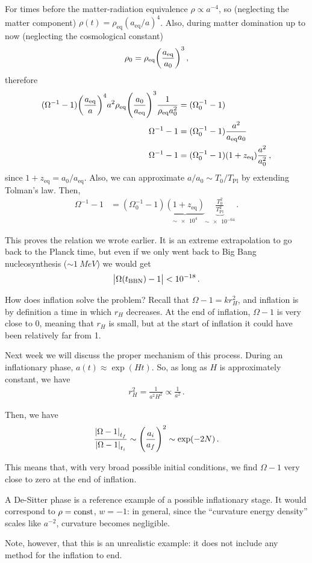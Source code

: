 \documentclass[main.tex]{subfiles}
\begin{document}
For times before the matter-radiation equivalence \(\rho \propto a^{-4}\), so (neglecting the matter component) \(\rho (t) = \rho _{\text{eq}} (a _{\text{eq}} / a)^{4}\). Also, during matter domination up to now (neglecting the cosmological constant)
%
\begin{align}
\rho_0 = \rho _{\text{eq}} \qty(\frac{a _{\text{eq}}}{a_0 })^3
\,,
\end{align}
%
therefore 
%
\begin{align}
(\Omega^{-1} -1) \qty(\frac{a _{\text{eq}}}{a})^{4} a^2 \rho _{\text{eq}} \qty(\frac{a_0 }{a _{\text{eq}}})^{3} \frac{1}{\rho _{\text{eq}} a_0^2} &= (\Omega_0^{-1} - 1)
\\
\Omega^{-1} - 1 &= (\Omega_0^{-1} -1) \frac{a^2}{a _{\text{eq}} a_0 } \\
\Omega^{-1} - 1 &= (\Omega_0^{-1} -1) (1 + z _{\text{eq}}) \frac{a^2}{a_0^2}
\,,
\end{align}
%
since \(1 + z _{\text{eq}} = a_0 / a _{\text{eq}}\). Also, we can approximate \(a/a_0 \sim T_0 / T _{\text{Pl}}\) by extending Tolman's law. 
Then, 
%
\begin{align}
\Omega^{-1} - 1 &= (\Omega_0^{-1} -1) \underbrace{(1 + z _{\text{eq}})}_{\sim \num{e4}} \underbrace{\frac{T_0 ^2}{T _{\text{Pl}}^2}}_{\sim \num{e-64}}
\,.
\end{align}

This proves the relation we wrote earlier. It is an extreme extrapolation to go back to the Planck time, but even if we only went back to Big Bang nucleosynthesis (\(\sim \SI{1}{MeV}\)) we would get 
%
\begin{align}
\abs{\Omega (t _{\text{BBN}}) - 1 } < \num{e-18}
\,.
\end{align}

How does inflation solve the problem?
Recall that \(\Omega -1  = k r_H^2\), and inflation is by definition a time in which \(r_H\) decreases. 
At the end of inflation, \(\Omega - 1\) is very close to 0, meaning that \(r_H\) is small, but at the start of inflation it could have been relatively far from 1. 

Next week we will discuss the proper mechanism of this process.
During an inflationary phase, \(a (t) \approx \exp(Ht)\). So, as long as \(H\) is approximately constant, we have
%
\begin{align}
r_H^2 = \frac{1}{a^2 H^2} \propto \frac{1}{a^2}
\,.
\end{align}

Then, we have 
%
\begin{align}
\frac{\abs{\Omega -1}_{t_f}}{\abs{\Omega - 1}_{t_i}} \sim \qty(\frac{a_i}{a_f})^{2} \sim \exp(- 2N)
\,.
\end{align}

This means that, with very broad possible initial conditions, we find \(\Omega -1\) very close to zero at the end of inflation. 

A De-Sitter phase is a reference example of a possible inflationary stage. 
It would correspond to \(\rho = \text{const}\), \(w = -1\): in general, since the ``curvature energy density'' scales like \(a^{-2}\), curvature becomes negligible. 

Note, however, that this is an unrealistic example: it does not include any method for the inflation to end. 
\end{document}
